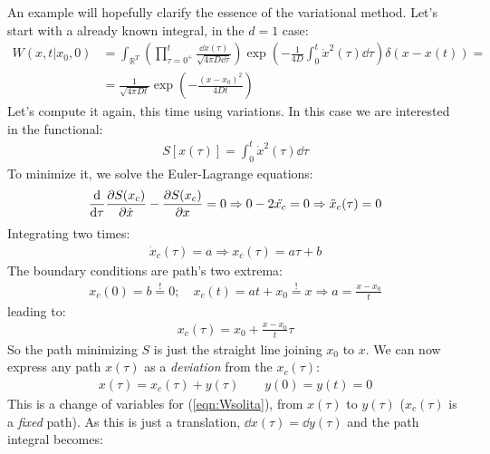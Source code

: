 \documentclass[../template.tex]{subfiles}
\begin{document}
\begin{example}
    An example will hopefully clarify the essence of the variational method. Let's start with a already known integral, in the $d=1$ case:
    \begin{align} \label{eqn:Wsolita}
        W(x,t|x_0,0) &= \int_{\mathbb{R}^T} \left(\prod_{\tau = 0^+}^t \frac{\dd{x(\tau)}}{\sqrt{4 \pi D \dd{\tau}}} \right) \exp\left(-\frac{1}{4D} \int_0^t \dot{x}^2(\tau) \dd{\tau} \right) \delta(x-x(t)) =\\\nonumber
        &= \frac{1}{\sqrt{4 \pi D t}} \exp\left(-\frac{(x-x_0)^2}{4 D t} \right) 
    \end{align}
    Let's compute it again, this time using variations.
    In this case we are interested in the functional:
    \begin{align}\label{eqn:S1}
        S[x(\tau)] = \int_0^t \dot{x}^2(\tau) \dd{\tau}
    \end{align}
    To minimize it, we solve the Euler-Lagrange equations:
    \begin{align*}
        \dv{\tau} \pdv{S(x_c)}{\dot{x}} - \pdv{S(x_c)}{x} = 0 \Rightarrow 0 - 2 \ddot{x_c} = 0 \Rightarrow \ddot{x}_c(\tau) = 0 
    \end{align*}
    Integrating two times:
    \begin{align*}
        \dot{x}_c(\tau) = a \Rightarrow x_c(\tau) = a \tau + b
    \end{align*}
    The boundary conditions are path's two extrema:
    \begin{align*}
        x_c(0) = b \overset{!}{=} 0; \quad x_c(t) = at + x_0 \overset{!}{=} x \Rightarrow a= \frac{x-x_0}{t} 
    \end{align*}
    leading to:
    \begin{align*}
        x_c(\tau) = x_0 + \frac{x-x_0}{t}\tau 
    \end{align*}
    So the path minimizing $S$ is just the straight line joining $x_0$ to $x$. We can now express any path $x(\tau)$ as a \textit{deviation} from the $x_c(\tau)$:
    \begin{align}
        x(\tau) = x_c(\tau) + y(\tau) \qquad y(0) = y(t) = 0 \label{eqn:xdef}
    \end{align}
    This is a change of variables for (\ref{eqn:Wsolita}), from $x(\tau)$ to $y(\tau)$ ($x_c(\tau)$ is a \textit{fixed} path). As this is just a translation, $\dd{x(\tau)} = \dd{y(\tau)}$ and the path integral becomes:
    \begin{align} \nonumber

\end{align}
\end{example}
\end{document}
